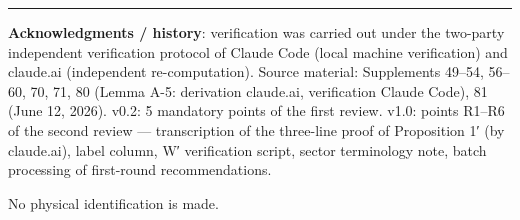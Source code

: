 \documentclass[
]{ltjsarticle}
\begin{document}
\begin{center}\rule{0.5\linewidth}{0.5pt}\end{center}

\textbf{Acknowledgments / history}: verification was carried out under
the two-party independent verification protocol of Claude Code (local
machine verification) and claude.ai (independent re-computation). Source
material: Supplements 49--54, 56--60, 70, 71, 80 (Lemma A-5: derivation
claude.ai, verification Claude Code), 81 (June 12, 2026). v0.2: 5
mandatory points of the first review. v1.0: points R1--R6 of the second
review --- transcription of the three-line proof of Proposition 1′ (by
claude.ai), label column, W′ verification script, sector terminology
note, batch processing of first-round recommendations.

No physical identification is made.
\end{document}
